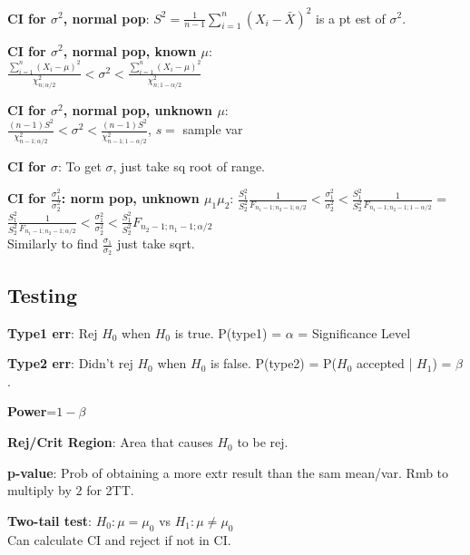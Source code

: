 \documentclass[a4paper,landscape]{article}
\newcommand{\rntopic}[1]{\vspace{-2.0em}\subsection*{#1}\vspace{-1.0em}}
\newcommand{\rnname}[1]{\textbf{#1}}
\begin{document}
\begin{multicols*}{4}
\begin{flatitemize}
\item \rnname{CI for $\sigma^2$, normal pop}: $S^2 = \frac{1}{n-1} \sum_{i=1}^{n}(X_i - \bar X)^2$ is a pt est of $\sigma^2$.
\item \rnname{CI for $\sigma^2$, normal pop, known $\mu$}: \\
$\frac{\sum_{i=1}^{n}(X_i - \mu)^2}{\chi_{n;\alpha/2}^2} < \sigma^2 < \frac{\sum_{i=1}^{n}(X_i - \mu)^2}{\chi_{n;1-\alpha/2}^2}$
\item \rnname{CI for $\sigma^2$, normal pop, unknown $\mu$}: \\
$\frac{(n-1)S^2}{\chi_{n-1;\alpha/2}^2} < \sigma^2 < \frac{(n-1)S^2}{\chi_{n-1;1-\alpha/2}^2}$, $s = $ sample var
\item \rnname{CI for $\sigma$}: To get $\sigma$, just take sq root of range.
\item \rnname{CI for $\frac{\sigma_1^2}{\sigma_2^2}$: norm pop, unknown $\mu_1 \mu_2$}:
$\frac{S_1^2}{S_2^2}\frac{1}{F_{n_1 - 1; n_2 - 1; \alpha/2}} < \frac{\sigma_1^2}{\sigma_2^2} < \frac{S_1^2}{S_2^2}\frac{1}{F_{n_1 - 1; n_2 - 1; 1-\alpha/2}}$ = \\
$\frac{S_1^2}{S_2^2}\frac{1}{F_{n_1 - 1; n_2 - 1; \alpha/2}} < \frac{\sigma_1^2}{\sigma_2^2} < \frac{S_1^2}{S_2^2}F_{n_2 - 1; n_1 - 1; \alpha/2}$ \\
Similarly to find $\frac{\sigma_1}{\sigma_2}$ just take sqrt.
\end{flatitemize}
\begin{flatitemize}
\rntopic{Testing}
\item \rnname{Type1 err}: Rej $H_0$ when $H_0$ is true. P(type1) = $\alpha$ = Significance Level
\item \rnname{Type2 err}: Didn't rej $H_0$ when $H_0$ is false. P(type2) = P($H_0$ accepted | $H_1$) = $\beta$.
\item \rnname{Power}=$1-\beta$
\item \rnname{Rej/Crit Region}: Area that causes $H_0$ to be rej.
\item \rnname{p-value}: Prob of obtaining a more extr result than the sam mean/var. Rmb to multiply by $2$ for 2TT.
\item \rnname{Two-tail test}: $H_0: \mu = \mu_0$ vs $H_1: \mu \neq \mu_0$ \\ Can calculate CI and reject if not in CI.

\end{flatitemize}
\end{multicols*}
\end{document}
